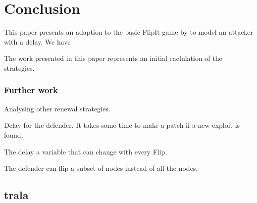 \chapter{Conclusion}
\label{chapter5:conclusion}

This paper presents an adaption to the basic FlipIt game by \citep{FlipIt} to model an attacker with a delay.  We have 

The work presented in this paper represents an initial caclulation of the strategies. 
\subsection{Further work}

\begin{description}
\item Analysing other renewal strategies.
\item Delay for the defender. It takes some time to make a patch if a new exploit is found.
\item The delay a variable that can change with every Flip.
\item The defender can flip a subset of nodes instead of all the nodes. \\

\end{description}

\section{trala}
